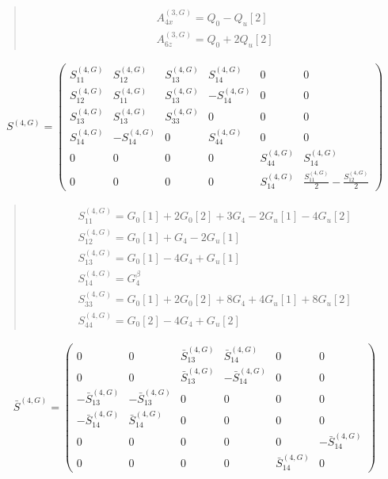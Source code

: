 \documentclass[fleqn,10pt]{jsarticle}
\begin{document}
\begin{quote}
\begin{align*}
& A^{(3,G)}_{4x} = Q_{0} - Q_{u}[2] \\
& A^{(3,G)}_{6z} = Q_{0} + 2 Q_{u}[2]
\end{align*}
\end{quote}
\begin{align*}
S^{(4,G)} = \begin{pmatrix} S^{(4,G)}_{11} & S^{(4,G)}_{12} & S^{(4,G)}_{13} & S^{(4,G)}_{14} & 0 & 0 \\ S^{(4,G)}_{12} & S^{(4,G)}_{11} & S^{(4,G)}_{13} & - S^{(4,G)}_{14} & 0 & 0 \\ S^{(4,G)}_{13} & S^{(4,G)}_{13} & S^{(4,G)}_{33} & 0 & 0 & 0 \\ S^{(4,G)}_{14} & - S^{(4,G)}_{14} & 0 & S^{(4,G)}_{44} & 0 & 0 \\ 0 & 0 & 0 & 0 & S^{(4,G)}_{44} & S^{(4,G)}_{14} \\ 0 & 0 & 0 & 0 & S^{(4,G)}_{14} & \frac{S^{(4,G)}_{11}}{2} - \frac{S^{(4,G)}_{12}}{2} \end{pmatrix}
\end{align*}
\begin{quote}
\begin{align*}
& S^{(4,G)}_{11} = G_{0}[1] + 2 G_{0}[2] + 3 G_{4} - 2 G_{u}[1] - 4 G_{u}[2] \\
& S^{(4,G)}_{12} = G_{0}[1] + G_{4} - 2 G_{u}[1] \\
& S^{(4,G)}_{13} = G_{0}[1] - 4 G_{4} + G_{u}[1] \\
& S^{(4,G)}_{14} = G_{4}^{\beta} \\
& S^{(4,G)}_{33} = G_{0}[1] + 2 G_{0}[2] + 8 G_{4} + 4 G_{u}[1] + 8 G_{u}[2] \\
& S^{(4,G)}_{44} = G_{0}[2] - 4 G_{4} + G_{u}[2]
\end{align*}
\end{quote}
\begin{align*}
\bar{S}^{(4,G)} = \begin{pmatrix} 0 & 0 & \bar{S}^{(4,G)}_{13} & \bar{S}^{(4,G)}_{14} & 0 & 0 \\ 0 & 0 & \bar{S}^{(4,G)}_{13} & - \bar{S}^{(4,G)}_{14} & 0 & 0 \\ - \bar{S}^{(4,G)}_{13} & - \bar{S}^{(4,G)}_{13} & 0 & 0 & 0 & 0 \\ - \bar{S}^{(4,G)}_{14} & \bar{S}^{(4,G)}_{14} & 0 & 0 & 0 & 0 \\ 0 & 0 & 0 & 0 & 0 & - \bar{S}^{(4,G)}_{14} \\ 0 & 0 & 0 & 0 & \bar{S}^{(4,G)}_{14} & 0 \end{pmatrix}
\end{align*}
\end{document}
